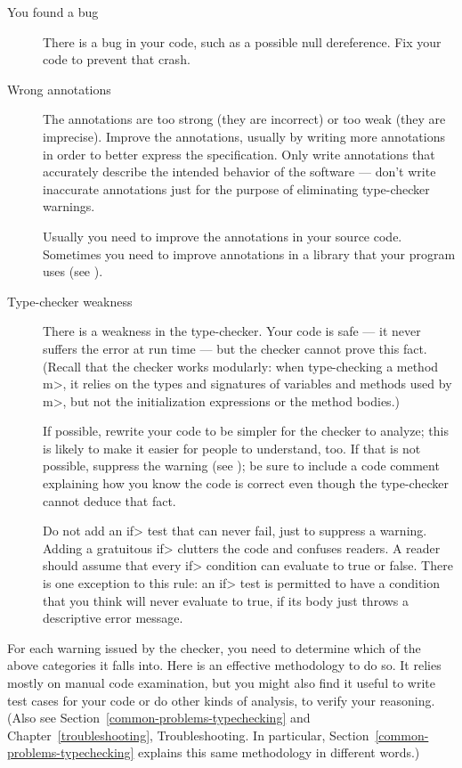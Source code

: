 \begin{description}
\item[You found a bug]
  There is a bug in your code, such as a possible null dereference.  Fix
  your code to prevent that crash.

\item[Wrong annotations]
  The annotations are too strong (they are incorrect) or too weak (they
  are imprecise).  Improve the
  annotations, usually by writing more annotations in order to better
  express the specification.
  Only write annotations that accurately describe the intended behavior of
  the software --- don't write inaccurate annotations just for the purpose
  of eliminating type-checker warnings.

  Usually you need to improve the annotations in your source code.
  Sometimes you need to improve annotations in a library that your program
  uses (see ).

\item[Type-checker weakness]
  There is a weakness in the type-checker.  Your code is safe --- it never
  suffers the error at run time --- but the checker cannot prove this fact.
  (Recall that the checker works modularly:  when type-checking a
  method \<m>, it relies on the types and signatures of variables and
  methods used by \<m>, but not the initialization expressions or the
  method bodies.)

  If possible, rewrite your code to be simpler for the checker to analyze;
  this is likely to make it easier for people to understand, too.
  If that is not possible, suppress the warning (see
  ); be sure to include a code
  comment explaining how you know the code is correct even though the
  type-checker cannot deduce that fact.

  Do not add an \<if> test that can never fail, just to suppress a
  warning.  Adding a gratuitous \<if> clutters the code and confuses
  readers.  A reader should assume that every \<if> condition can evaluate to true
  or false.  There is one exception to this rule:  an \<if> test is permitted to have a
  condition that you think will never evaluate to true, if its body just throws a
  descriptive error message.
\end{description}

For each warning issued by the checker, you need to determine which of the
above categories it falls into.  Here is an effective methodology to do so.
It relies mostly on manual code examination, but you might also find it
useful to write test cases for your code or do other kinds of analysis, to
verify your reasoning.
(Also see
Section~\ref{common-problems-typechecking} and
Chapter~\ref{troubleshooting}, Troubleshooting.
In particular, Section~\ref{common-problems-typechecking} explains this
same methodology in different words.)


